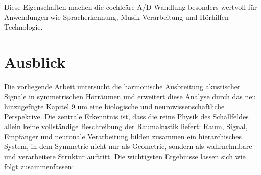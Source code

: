 ﻿\documentclass[12pt, a4paper]{article}
\theoremstyle{definition}
\theoremstyle{remark}
\begin{document}
Diese Eigenschaften machen die cochleäre A/D-Wandlung besonders wertvoll für 
Anwendungen wie Spracherkennung, Musik-Verarbeitung und Hörhilfen-Technologie.

\section{Ausblick}
\label{sec:ausblick}

Die vorliegende Arbeit untersucht die harmonische Ausbreitung akustischer Signale
in symmetrischen Hörräumen und erweitert diese Analyse durch das neu hinzugefügte
Kapitel 9 um eine biologische und neurowissenschaftliche Perspektive. Die zentrale
Erkenntnis ist, dass die reine Physik des Schallfeldes allein keine vollständige
Beschreibung der Raumakustik liefert: Raum, Signal, Empfänger und neuronale
Verarbeitung bilden zusammen ein hierarchisches System, in dem Symmetrie nicht nur
als Geometrie, sondern als wahrnehmbare und verarbeitete Struktur auftritt.
Die wichtigsten Ergebnisse lassen sich wie folgt zusammenfassen:
\end{document}
